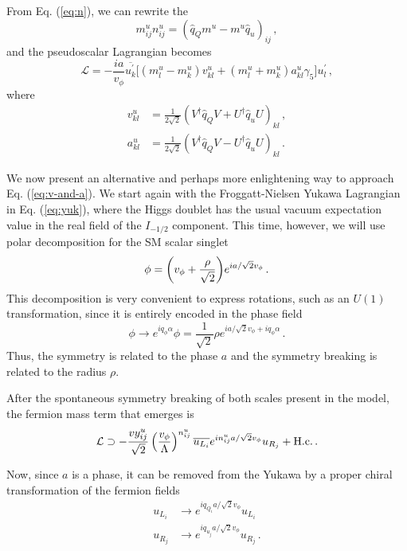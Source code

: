 \documentclass[prd,amsfonts,onecolumn,superscriptaddress,aps,nofootinbib,11pt]{revtex4-1}
\begin{document}
From Eq. (\ref{eq:n}), we can rewrite the 
\begin{equation}
	m_{ij}^u n_{ij}^u = (\hat{q}_Q m^u - m^u \hat{q}_u)_{ij} \,,
\end{equation}
and the pseudoscalar Lagrangian becomes
\begin{equation}
    \mathcal{L} = -\frac{ia}{v_\phi} \overline{u_k^\prime} \bigg[  (m^u_l- m^u_k )v_{kl}^u + (m^u_l + m^u_k )a_{kl}^u \gamma_5 \bigg] u_l^\prime \,,
\end{equation}
where
\begin{equation}\label{eq:v-and-a}
    \begin{split}
        v_{kl}^u &= \frac{1}{2\sqrt{2} } \left( V^\dagger \hat{q}_Q V + U^\dagger \hat{q}_u U \right)_{kl} \,, \\
        a_{kl}^u &= \frac{1}{2\sqrt{2} } \left( V^\dagger \hat{q}_Q V - U^\dagger \hat{q}_u U \right)_{kl} \,.
    \end{split}
\end{equation}

We now present an alternative and perhaps more enlightening way to approach Eq. (\ref{eq:v-and-a}). We start again with the Froggatt-Nielsen Yukawa Lagrangian in Eq. (\ref{eq:yuk}), where the Higgs doublet has the usual vacuum expectation value in the real field of the $I_{-1/2}$ component. This time, however, we will use polar decomposition for the SM scalar singlet
\begin{equation}
    \phi =  \qty(v_\phi + \frac{\rho}{\sqrt{2}}) e^{i a / \sqrt{2} v_\phi} \,.
\end{equation}
This decomposition is very convenient to express rotations, such as an $U(1)$ transformation, since it is entirely encoded in the phase field
\begin{equation}
    \phi \to e^{i q_\phi \alpha} \phi = \frac{1}{\sqrt{2}} \rho e^{ia/\sqrt{2}v_\phi + iq_\phi \alpha} \,.
\end{equation}
Thus, the symmetry is related to the phase $a$ and the symmetry breaking is related to the radius $\rho$.


After the spontaneous symmetry breaking of both scales present in the model, the fermion mass term that emerges is
\begin{equation}
    \mathcal{L} \supset -\frac{vy^u_{ij}}{\sqrt{2}} \left( \frac{v_\phi}{\Lambda} \right)^{n_{ij}^u}  \overline{u_{L_i}} e^{i n_{ij}^u a/\sqrt{2}v_\phi} u_{R_j} + \rm{H.c.} \,.
\end{equation}

Now, since $a$ is a phase, it can be removed from the Yukawa by a proper chiral transformation of the fermion fields
\begin{equation}\label{eq:chiral}
    \begin{split}
        u_{L_i} &\to e^{i q_{Q_i} a/\sqrt{2}v_\phi} u_{L_i} \\
        u_{R_j} &\to e^{i q_{u_j} a/ \sqrt{2}v_\phi} u_{R_j}\,.
    \end{split}
\end{equation}
\end{document}
